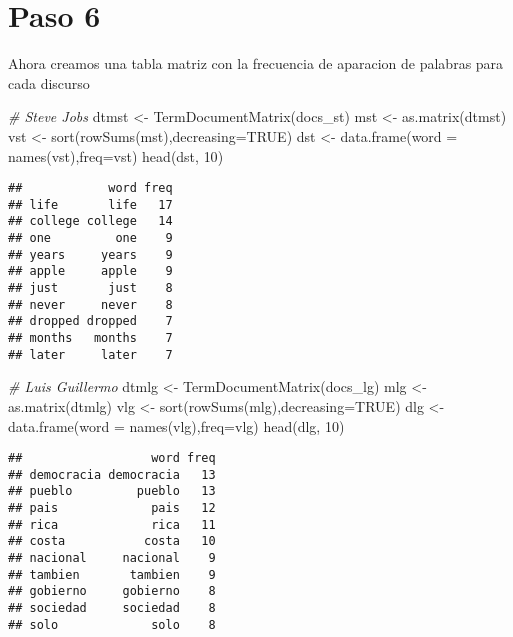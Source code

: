 \documentclass[
]{article}
\newenvironment{Shaded}{\begin{snugshade}}{\end{snugshade}}
\newcommand{\AttributeTok}[1]{\textcolor[rgb]{0.77,0.63,0.00}{#1}}
\newcommand{\CommentTok}[1]{\textcolor[rgb]{0.56,0.35,0.01}{\textit{#1}}}
\newcommand{\ConstantTok}[1]{\textcolor[rgb]{0.00,0.00,0.00}{#1}}
\newcommand{\DecValTok}[1]{\textcolor[rgb]{0.00,0.00,0.81}{#1}}
\newcommand{\FunctionTok}[1]{\textcolor[rgb]{0.00,0.00,0.00}{#1}}
\newcommand{\NormalTok}[1]{#1}
\newcommand{\OtherTok}[1]{\textcolor[rgb]{0.56,0.35,0.01}{#1}}
\begin{document}
\hypertarget{paso-6}{%
\section{Paso 6}\label{paso-6}}

Ahora creamos una tabla matriz con la frecuencia de aparacion de
palabras para cada discurso

\begin{Shaded}
\begin{Highlighting}[]
\CommentTok{\# Steve Jobs}
\NormalTok{dtmst }\OtherTok{\textless{}{-}} \FunctionTok{TermDocumentMatrix}\NormalTok{(docs\_st)}
\NormalTok{mst }\OtherTok{\textless{}{-}} \FunctionTok{as.matrix}\NormalTok{(dtmst)}
\NormalTok{vst }\OtherTok{\textless{}{-}} \FunctionTok{sort}\NormalTok{(}\FunctionTok{rowSums}\NormalTok{(mst),}\AttributeTok{decreasing=}\ConstantTok{TRUE}\NormalTok{)}
\NormalTok{dst }\OtherTok{\textless{}{-}} \FunctionTok{data.frame}\NormalTok{(}\AttributeTok{word =} \FunctionTok{names}\NormalTok{(vst),}\AttributeTok{freq=}\NormalTok{vst)}
\FunctionTok{head}\NormalTok{(dst, }\DecValTok{10}\NormalTok{)}
\end{Highlighting}
\end{Shaded}

\begin{verbatim}
##            word freq
## life       life   17
## college college   14
## one         one    9
## years     years    9
## apple     apple    9
## just       just    8
## never     never    8
## dropped dropped    7
## months   months    7
## later     later    7
\end{verbatim}

\begin{Shaded}
\begin{Highlighting}[]
\CommentTok{\# Luis Guillermo}
\NormalTok{dtmlg }\OtherTok{\textless{}{-}} \FunctionTok{TermDocumentMatrix}\NormalTok{(docs\_lg)}
\NormalTok{mlg }\OtherTok{\textless{}{-}} \FunctionTok{as.matrix}\NormalTok{(dtmlg)}
\NormalTok{vlg }\OtherTok{\textless{}{-}} \FunctionTok{sort}\NormalTok{(}\FunctionTok{rowSums}\NormalTok{(mlg),}\AttributeTok{decreasing=}\ConstantTok{TRUE}\NormalTok{)}
\NormalTok{dlg }\OtherTok{\textless{}{-}} \FunctionTok{data.frame}\NormalTok{(}\AttributeTok{word =} \FunctionTok{names}\NormalTok{(vlg),}\AttributeTok{freq=}\NormalTok{vlg)}
\FunctionTok{head}\NormalTok{(dlg, }\DecValTok{10}\NormalTok{)}
\end{Highlighting}
\end{Shaded}

\begin{verbatim}
##                  word freq
## democracia democracia   13
## pueblo         pueblo   13
## pais             pais   12
## rica             rica   11
## costa           costa   10
## nacional     nacional    9
## tambien       tambien    9
## gobierno     gobierno    8
## sociedad     sociedad    8
## solo             solo    8
\end{verbatim}
\end{document}
